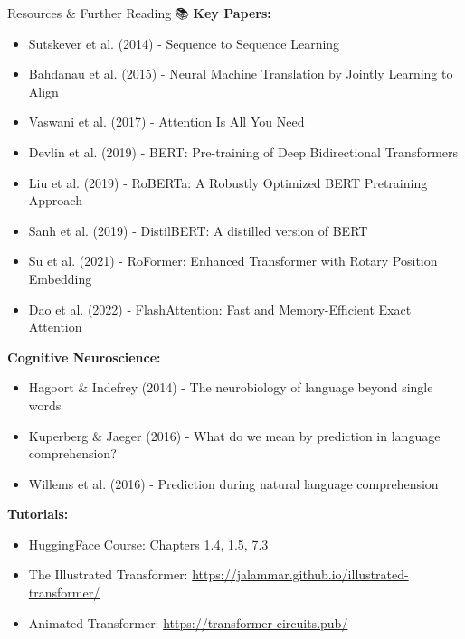 \documentclass[aspectratio=169]{beamer}
\begin{document}
\begin{frame}[shrink=10]{Resources \& Further Reading 📚}
\textbf{Key Papers:}
\begin{itemize}\setlength{\itemsep}{0pt}
    \item Sutskever et al. (2014) - Sequence to Sequence Learning
    \item Bahdanau et al. (2015) - Neural Machine Translation by Jointly Learning to Align
    \item Vaswani et al. (2017) - Attention Is All You Need
    \item Devlin et al. (2019) - BERT: Pre-training of Deep Bidirectional Transformers
    \item Liu et al. (2019) - RoBERTa: A Robustly Optimized BERT Pretraining Approach
    \item Sanh et al. (2019) - DistilBERT: A distilled version of BERT
    \item Su et al. (2021) - RoFormer: Enhanced Transformer with Rotary Position Embedding
    \item Dao et al. (2022) - FlashAttention: Fast and Memory-Efficient Exact Attention
\end{itemize}

\vspace{0.5em}

\textbf{Cognitive Neuroscience:}
\begin{itemize}\setlength{\itemsep}{0pt}
    \item Hagoort \& Indefrey (2014) - The neurobiology of language beyond single words
    \item Kuperberg \& Jaeger (2016) - What do we mean by prediction in language comprehension?
    \item Willems et al. (2016) - Prediction during natural language comprehension
\end{itemize}

\vspace{0.5em}

\textbf{Tutorials:}
\begin{itemize}\setlength{\itemsep}{0pt}
    \item HuggingFace Course: Chapters 1.4, 1.5, 7.3
    \item The Illustrated Transformer: \url{https://jalammar.github.io/illustrated-transformer/}
    \item Animated Transformer: \url{https://transformer-circuits.pub/}
\end{itemize}
\end{frame}
\end{document}
